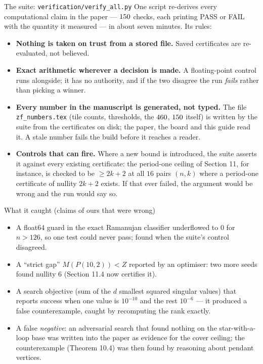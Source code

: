 \documentclass[11pt]{article}
\begin{document}
\begin{callbox}{The suite: \texttt{verification/verify\_all.py}}
One script re-derives every computational claim in the paper --- $150$ checks, each printing PASS or FAIL with the quantity it measured --- in about seven minutes. Its rules:
\begin{itemize}[leftmargin=*,nosep]
  \item \textbf{Nothing is taken on trust from a stored file.} Saved certificates are re-evaluated, not believed.
  \item \textbf{Exact arithmetic wherever a decision is made.} A floating-point control runs alongside; it has no authority, and if the two disagree the run \emph{fails} rather than picking a winner.
  \item \textbf{Every number in the manuscript is generated, not typed.} The file \texttt{zf\_numbers.tex} (tile counts, thresholds, the $460$, $150$ itself) is written by the suite from the certificates on disk; the paper, the board and this guide read it. A stale number fails the build before it reaches a reader.
  \item \textbf{Controls that can fire.} Where a new bound is introduced, the suite asserts it against every existing certificate: the period-one ceiling of Section 11, for instance, is checked to be $\ge2k+2$ at all $16$ pairs $(n,k)$ where a period-one certificate of nullity $2k+2$ exists. If that ever failed, the argument would be wrong and the run would say so.
\end{itemize}
\end{callbox}

\begin{callbox}{What it caught (claims of ours that were wrong)}
\begin{itemize}[leftmargin=*,nosep]
  \item A float64 guard in the exact Ramanujan classifier underflowed to $0$ for $n>126$, so one test could never pass; found when the suite's control disagreed.
  \item A ``strict gap'' $M(P(10,2))<Z$ reported by an optimiser: two more seeds found nullity $6$ (Section 11.4 now certifies it).
  \item A search objective (sum of the $d$ smallest squared singular values) that reports success when one value is $10^{-10}$ and the rest $10^{-6}$ --- it produced a false counterexample, caught by recomputing the rank exactly.
  \item A false \emph{negative}: an adversarial search that found nothing on the star-with-a-loop base was written into the paper as evidence for the cover ceiling; the counterexample (Theorem 10.4) was then found by reasoning about pendant vertices.
\end{itemize}
\end{callbox}
\end{document}

